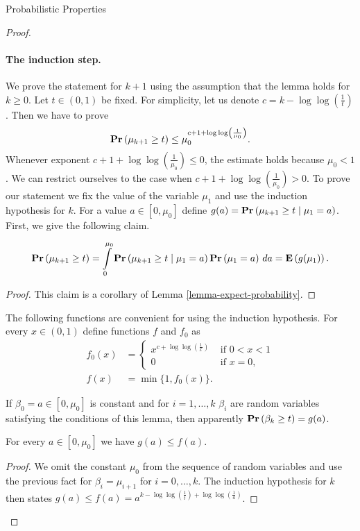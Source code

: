 \begin{section}{Probabilistic Properties}
\begin{proof}
\paragraph*{The induction step.} We prove the statement for $k + 1$ using the assumption that the lemma holds for $k \geq 0$. Let $t \in (0, 1)$ be fixed. For simplicity, let us denote $c = k - \log \log \left(\frac{1}{t}\right)$. Then we have to prove
\[
	\mathbf{Pr}\left(\mu_{k + 1} \geq t\right) \leq \mu_0 ^ {c + 1 + \log \log \left(\frac{1}{\mu_0}\right)} \text{.}
\]
Whenever exponent $c + 1 + \log \log \left(\frac{1}{\mu_0}\right) \leq 0$, the estimate holds because $\mu_0 < 1$. We can restrict ourselves to the case when $c + 1 + \log \log \left(\frac{1}{\mu_0}\right) > 0$. To prove our statement we fix the value of the variable $\mu_1$ and use the induction hypothesis for $k$. For a value $a \in \left[0, \mu_0\right]$ define $g(a) = \mathbf{Pr}\left(\mu_{k + 1} \geq t \mid \mu_1 = a\right)$. First, we give the following claim.
\begin{claim}
\label{claim-expected-value}
\[
	\mathbf{Pr}\left(\mu_{k + 1} \geq t\right) = \int\limits_{0}^{\mu_0}\mathbf{Pr}\left(\mu_{k + 1} \geq t \mid \mu_1 = a\right)\mathbf{Pr}\left(\mu_1 = a\right) \, da = \mathbf{E}\left(g(\mu_1)\right) \text{.}
\]
\end{claim}
\begin{proof}
This claim is a corollary of Lemma \ref{lemma-expect-probability}.
\end{proof}

The following functions are convenient for using the induction hypothesis. For every $x \in (0, 1)$ define functions $f$ and $f_0$ as
\[ 
\begin{split}
f_0(x) &= \begin{cases}
	x ^ {c + \log \log \left(\frac{1}{x}\right)} & \text{ if } 0 < x < 1 \\ 
	0 & \text{ if } x = 0 \text{,}
\end{cases} \\
f(x) & = \min \{1, f_0(x) \} \text{.} 
\end{split}
\]

If $\beta_0 = a \in \left[0, \mu_0 \right]$ is constant and for $i = 1, \dots, k$ $\beta_i$ are random variables satisfying the conditions of this lemma, then apparently $\mathbf{Pr}\left(\beta_k \geq t\right) = g(a)$. 

\begin{claim}
\label{claim-estimate-g}
For every $a \in \left[0, \mu_0 \right]$ we have $g(a) \leq f(a)$.
\end{claim}
\begin{proof}
We omit the constant $\mu_0$ from the sequence of random variables and use the previous fact for $\beta_{i} = \mu_{i + 1}$ for $i = 0, \dots, k$. The induction hypothesis for $k$ then states $g(a) \leq f(a) = a^{k - \log \log \left(\frac{1}{t}\right) + \log \log \left(\frac{1}{a}\right)}$. 
\end{proof}


\end{proof}
\end{section}
